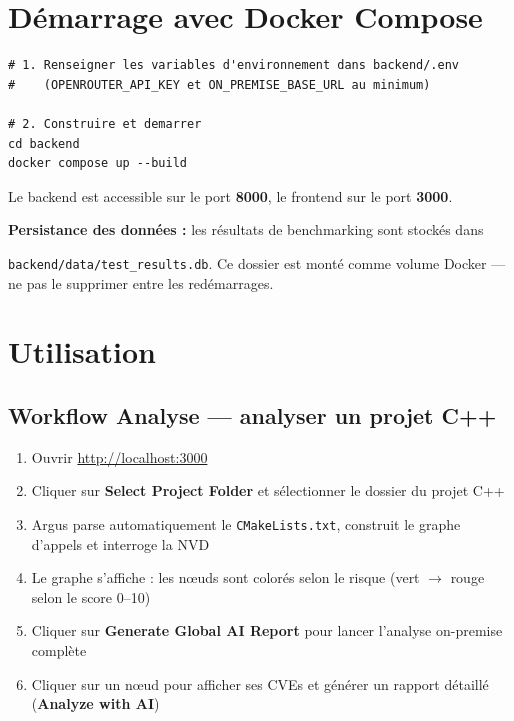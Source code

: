 \documentclass[a4paper, 12pt, hidelinks]{article}
\begin{document}
\section{Démarrage avec Docker Compose}

\begin{lstlisting}[caption={Deploiement avec Docker Compose}]
# 1. Renseigner les variables d'environnement dans backend/.env
#    (OPENROUTER_API_KEY et ON_PREMISE_BASE_URL au minimum)

# 2. Construire et demarrer
cd backend
docker compose up --build
\end{lstlisting}

Le backend est accessible sur le port \textbf{8000}, le frontend sur le port \textbf{3000}.

\begin{mdframed}[backgroundcolor=LightBlue]
\textbf{Persistance des données :} les résultats de benchmarking sont stockés dans 

\texttt{backend/data/test\_results.db}. Ce dossier est monté comme volume Docker --- ne pas le supprimer entre les redémarrages.
\end{mdframed}

\section{Utilisation}

\subsection*{Workflow Analyse — analyser un projet C++}

\begin{enumerate}
  \item Ouvrir \url{http://localhost:3000}
  \item Cliquer sur \textbf{Select Project Folder} et sélectionner le dossier du projet C++
  \item Argus parse automatiquement le \texttt{CMakeLists.txt}, construit le graphe d'appels et interroge la NVD
  \item Le graphe s'affiche : les nœuds sont colorés selon le risque (vert $\rightarrow$ rouge selon le score 0--10)
  \item Cliquer sur \textbf{Generate Global AI Report} pour lancer l'analyse on-premise complète
  \item Cliquer sur un nœud pour afficher ses CVEs et générer un rapport détaillé (\textbf{Analyze with AI})
\end{enumerate}
\end{document}
